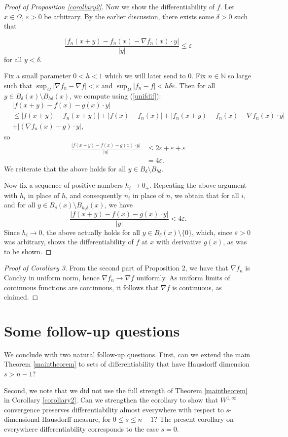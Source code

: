 \documentclass{article}
\begin{document}
\begin{proof}[Proof of Proposition \ref{corollary2}]
Now we show the differentiability of $f$. Let $x \in \Omega$, $\varepsilon > 0$ be arbitrary. By the earlier discussion, there exists some $\delta > 0$ such that

$$\frac{|f_n (x+y) - f_n (x) - \nabla f_n (x) \cdot y|}{|y|} \leq \varepsilon$$
for all $y < \delta$.

Fix a small parameter $0 < h < 1$ which we will later send to $0$. Fix $n \in \mathbb N$ so large such that $\sup_{\Omega} |\nabla f_n - \nabla f| < \varepsilon$ and $\sup_{\Omega} |f_n - f| < h \delta \varepsilon$. Then for all $y \in B_{\delta}(x) \setminus B_{h\delta}(x)$, we compute using (\ref{unifdif}):
$$\begin{aligned}&|f(x+y) - f(x) - g(x) \cdot y|\\&\leq |f(x+y) - f_n (x+y)| + |f(x) - f_n (x)| + |f_n (x+y) - f_n (x) - \nabla f_n (x) \cdot y| \\
&+ |(\nabla f_n (x) - g) \cdot y|,\end{aligned} $$
so
$$\begin{aligned}\frac{|f(x+y) - f(x) - g(x) \cdot y|}{|y|} & \leq 2 \varepsilon + \varepsilon + \varepsilon \\
& = 4\varepsilon.\end{aligned}$$
We reiterate that the above holds for all $y \in B_{\delta} \setminus B_{h\delta}$.

Now fix a sequence of positive numbers $h_i \to 0_+$. Repeating the above argument with $h_i$ in place of $h$, and consequently $n_i$ in place of $n$, we obtain that for all $i$, and for all $y \in B_\delta (x) \setminus B_{h_i \delta}(x)$, we have
$$\frac{|f(x+y) - f(x) - g(x) \cdot y|}{|y|} < 4\varepsilon.$$
Since $h_i \to 0$, the above actually holds for all $y \in B_\delta(x) \setminus \{0\}$, which, since $\varepsilon > 0$ was arbitrary, shows the differentiability of $f$ at $x$ with derivative $g(x)$, as was to be shown.
\end{proof}

\begin{proof}[Proof of Corollary 3]
From the second part of Proposition $2$, we have that $\nabla f_n$ is Cauchy in uniform norm, hence $\nabla f_n \to \nabla f$ uniformly. As uniform limits of continuous functions are continuous, it follows that $\nabla f$ is continuous, as claimed.
\end{proof}
\section{Some follow-up questions}
We conclude with two natural follow-up questions. First, can we extend the main Theorem \ref{maintheorem} to sets of differentiability that have Hausdorff dimension $s > n-1$?

\noindent Second, we note that we did not use the full strength of Theorem \ref{maintheorem} in Corollary \ref{corollary2}. Can we strengthen the corollary to show that $W^{1, \infty}$ convergence preserves differentiability almost everywhere with respect to $s$-dimensional Hausdorff measure, for $0 \leq s \leq n-1$? The present corollary on everywhere differentiability corresponds to the case $s = 0$.

\printbibliography


 
\end{document}
